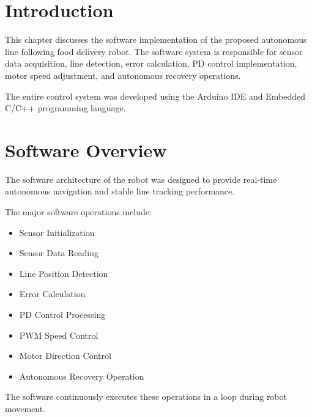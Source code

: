 \documentclass[12pt,a4paper,oneside]{report}
\begin{document}
\section{Introduction}

This chapter discusses the software implementation of the proposed autonomous line following food delivery robot. The software system is responsible for sensor data acquisition, line detection, error calculation, PD control implementation, motor speed adjustment, and autonomous recovery operations.

The entire control system was developed using the Arduino IDE and Embedded C/C++ programming language.


\section{Software Overview}

The software architecture of the robot was designed to provide real-time autonomous navigation and stable line tracking performance.

The major software operations include:

\begin{itemize}

\item Sensor Initialization

\item Sensor Data Reading

\item Line Position Detection

\item Error Calculation

\item PD Control Processing

\item PWM Speed Control

\item Motor Direction Control

\item Autonomous Recovery Operation

\end{itemize}

The software continuously executes these operations in a loop during robot movement.

\end{document}
